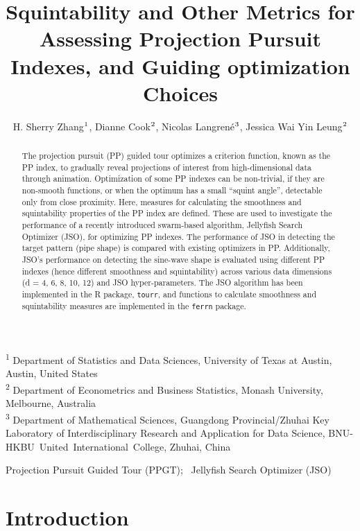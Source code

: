 \documentclass[
  12pt,
]{interact}
\title{Squintability and Other Metrics for Assessing Projection Pursuit
Indexes, and Guiding optimization Choices}
\author{H. Sherry Zhang$\textsuperscript{1}$, Dianne
Cook$\textsuperscript{2}$, Nicolas
Langrené$\textsuperscript{3}$, Jessica Wai Yin
Leung$\textsuperscript{2}$}
\theoremstyle{plain}
\begin{document}
\captionsetup{labelsep=space}
\maketitle
\textsuperscript{1} Department of Statistics and Data
Sciences, University of Texas at Austin, Austin, United
States\\ \textsuperscript{2} Department of Econometrics and Business
Statistics, Monash
University, Melbourne, Australia\\ \textsuperscript{3} Department of
Mathematical Sciences, Guangdong Provincial/Zhuhai Key Laboratory of
Interdisciplinary Research and Application for Data Science,
BNU-HKBU~United~International~College, Zhuhai, China
\begin{abstract}
The projection pursuit (PP) guided tour optimizes a criterion function,
known as the PP index, to gradually reveal projections of interest from
high-dimensional data through animation. Optimization of some PP indexes
can be non-trivial, if they are non-smooth functions, or when the
optimum has a small ``squint angle'', detectable only from close
proximity. Here, measures for calculating the smoothness and
squintability properties of the PP index are defined. These are used to
investigate the performance of a recently introduced swarm-based
algorithm, Jellyfish Search Optimizer (JSO), for optimizing PP indexes.
The performance of JSO in detecting the target pattern (pipe shape) is
compared with existing optimizers in PP. Additionally, JSO's performance
on detecting the sine-wave shape is evaluated using different PP indexes
(hence different smoothness and squintability) across various data
dimensions (d = 4, 6, 8, 10, 12) and JSO hyper-parameters. The JSO
algorithm has been implemented in the R package, \texttt{tourr}, and
functions to calculate smoothness and squintability measures are
implemented in the \texttt{ferrn} package.
\end{abstract}
\begin{keywords}
\def\sep{;\ }
Projection Pursuit Guided Tour (PPGT)\sep 
Jellyfish Search Optimizer (JSO)
\end{keywords}


\section{Introduction}\label{introduction}
\end{document}
